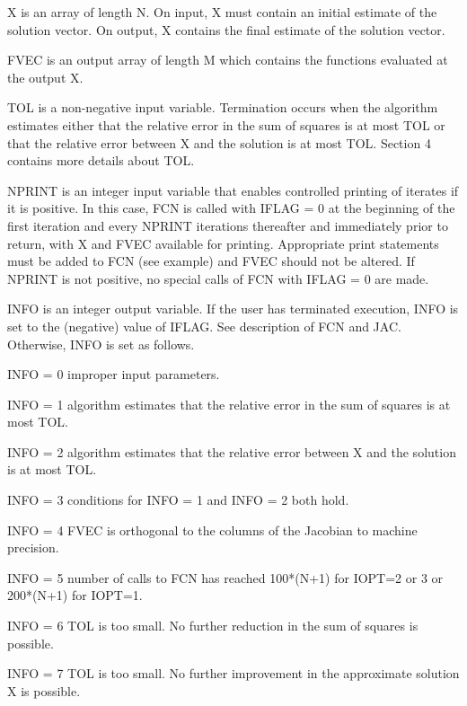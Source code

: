 \documentclass[11pt,twoside,nolof]{starlink}
\begin{document}
\begin{terminalv}
       X is an array of length N.  On input, X must contain an initial
         estimate of the solution vector.  On output, X contains the
         final estimate of the solution vector.

       FVEC is an output array of length M which contains the functions
         evaluated at the output X.

       TOL is a non-negative input variable.  Termination occurs when
         the algorithm estimates either that the relative error in the
         sum of squares is at most TOL or that the relative error
         between X and the solution is at most TOL.  Section 4 contains
         more details about TOL.

       NPRINT is an integer input variable that enables controlled
         printing of iterates if it is positive.  In this case, FCN is
         called with IFLAG = 0 at the beginning of the first iteration
         and every NPRINT iterations thereafter and immediately prior
         to return, with X and FVEC available for printing. Appropriate
         print statements must be added to FCN (see example) and
         FVEC should not be altered.  If NPRINT is not positive, no
         special calls of FCN with IFLAG = 0 are made.

       INFO is an integer output variable.  If the user has terminated
        execution, INFO is set to the (negative) value of IFLAG.  See
        description of FCN and JAC. Otherwise, INFO is set as follows.

         INFO = 0  improper input parameters.

         INFO = 1  algorithm estimates that the relative error in the
                   sum of squares is at most TOL.

         INFO = 2  algorithm estimates that the relative error between
                   X and the solution is at most TOL.

         INFO = 3  conditions for INFO = 1 and INFO = 2 both hold.

         INFO = 4  FVEC is orthogonal to the columns of the Jacobian to
                   machine precision.

         INFO = 5  number of calls to FCN has reached 100*(N+1)
                   for IOPT=2 or 3 or 200*(N+1) for IOPT=1.

         INFO = 6  TOL is too small.  No further reduction in the sum
                   of squares is possible.

         INFO = 7  TOL is too small.  No further improvement in the
                   approximate solution X is possible.


\end{terminalv}
\end{document}
